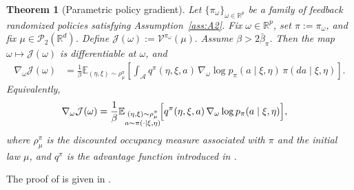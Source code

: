 \documentclass[a4paper, 10pt, english, reqno]{amsart}
\newtheorem{theorem}{Theorem}[section]
\begin{document}
\begin{theorem}[Parametric policy gradient]
\label{thm:parametric-policy-gradient}
Let $\{\pi_\omega\}_{\omega\in\mathbb R^p}$ be a family of feedback
randomized policies satisfying Assumption~\ref{ass:A2}. Fix
$\omega\in\mathbb R^p$, set $\pi:=\pi_\omega$, and fix
$\mu\in\mathcal P_2(\mathbb R^d)$. Define $\mathcal J(\omega):=\mathcal V^{\pi_\omega}(\mu).$ Assume $\beta>2\bar\beta_\pi$. Then the map
$\omega\mapsto \mathcal J(\omega)$ is differentiable at $\omega$, and
\begin{equation}\label{eq:parametric-pg}
\begin{aligned}
\nabla_\omega \mathcal J(\omega)
&= \frac{1}{\beta}
\mathbb E_{(\eta,\xi)\sim\rho_\mu^\pi}\!\left[
\int_{\mathcal A}
q^\pi(\eta,\xi,a)\,
\nabla_\omega \log p_\pi(a\mid\xi,\eta)\,
\pi(da\mid\xi,\eta)
\right].
\end{aligned}
\end{equation}
Equivalently,
\begin{equation*}
\begin{aligned}
\nabla_\omega \mathcal J(\omega)
&=\frac{1}{\beta}
\mathbb E_{\substack{(\eta,\xi)\sim\rho_\mu^\pi\\ a\sim\pi(\cdot\mid\xi,\eta)}}\!\Bigl[
q^\pi(\eta,\xi,a)\,
\nabla_\omega \log p_\pi(a\mid\xi,\eta)
\Bigr],
\end{aligned}
\end{equation*}
where $\rho_\mu^\pi$ is the discounted occupancy measure associated with
$\pi$ and the initial law $\mu$, and $q^\pi$ is the advantage function
introduced in .
\end{theorem}
 The proof of  is given in .
\end{document}
